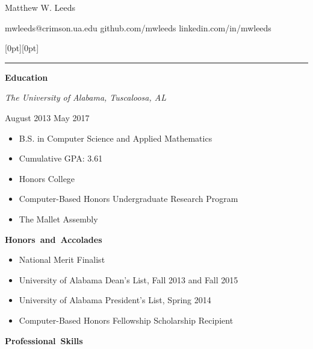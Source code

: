 \documentclass[11pt]{article}
\begin{document}
\centerline{\huge Matthew W. Leeds}
\vspace{0.4em}
\centerline{\normalsize mwleeds@crimson.ua.edu \space \textbar \space github.com/mwleeds \space \textbar \space linkedin.com/in/mwleeds}

\noindent \begin{minipage}[t]{\textwidth}
\raisebox{9pt}[0pt][0pt]{\rule{\textwidth}{0.2mm}\hspace{-\textwidth}}
\end{minipage}

\vspace{0.8em}
\hbox{\large \textbf{Education}}

\begin{minipage}[t]{0.65\textwidth}
\flushleft
\textit{The University of Alabama, Tuscaloosa, AL}\\
\end{minipage}
\begin{minipage}[t]{0.30\textwidth}
\flushright
August 2013 \space \textemdash \space May 2017\\
\end{minipage}

\begin{itemize}
  \item B.S. in Computer Science and Applied Mathematics
  \item Cumulative GPA: 3.61
  \item Honors College
  \item Computer-Based Honors Undergraduate Research Program
  \item The Mallet Assembly
\end{itemize}

\vspace{0.8em}
\hbox{\large \textbf{Honors and Accolades}}

\begin{itemize}
  \item National Merit Finalist
  \item University of Alabama Dean's List, Fall 2013 and Fall 2015
  \item University of Alabama President's List, Spring 2014
  \item Computer-Based Honors Fellowship Scholarship Recipient
\end{itemize}

\vspace{0.8em}
\hbox{\large \textbf{Professional Skills}}
\end{document}
